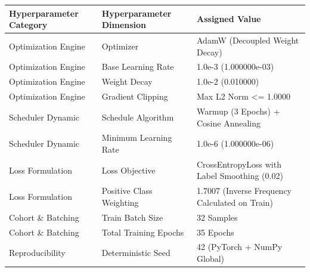 \begin{tabular}{lll}
\toprule
Hyperparameter Category & Hyperparameter Dimension & Assigned Value \\
\midrule
Optimization Engine & Optimizer & AdamW (Decoupled Weight Decay) \\
Optimization Engine & Base Learning Rate & 1.0e-3 (1.000000e-03) \\
Optimization Engine & Weight Decay & 1.0e-2 (0.010000) \\
Optimization Engine & Gradient Clipping & Max L2 Norm <= 1.0000 \\
Scheduler Dynamic & Schedule Algorithm & Warmup (3 Epochs) + Cosine Annealing \\
Scheduler Dynamic & Minimum Learning Rate & 1.0e-6 (1.000000e-06) \\
Loss Formulation & Loss Objective & CrossEntropyLoss with Label Smoothing (0.02) \\
Loss Formulation & Positive Class Weighting & 1.7007 (Inverse Frequency Calculated on Train) \\
Cohort \& Batching & Train Batch Size & 32 Samples \\
Cohort \& Batching & Total Training Epochs & 35 Epochs \\
Reproducibility & Deterministic Seed & 42 (PyTorch + NumPy Global) \\
\bottomrule
\end{tabular}

